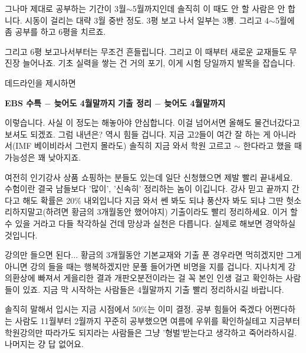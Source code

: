 그나마 제대로 공부하는 기간이 3월$\sim$5월까지인데 솔직히 이 때도 안 할 사람은 안 합니다.
시동이 걸리는 대략 3월 중반 정도. 3평 보고 나서 일부는 3뽕.
그리고 4$\sim$5월에 좀 공부를 하고 6평을 치르죠.
\vspace{5mm}

그리고 6평 보고나서부터는 무조건 흔들립니다. 그리고 이 때부터 새로운 교재들도 무진장 늘어나죠.
기초 실력을 쌓는 건 거의 포기, 이게 시험 당일까지 발목을 잡습니다.
\vspace{5mm}

데드라인을 제시하면
\vspace{5mm}

\textbf{EBS 수특 $-$ 늦어도 4월말까지}
\textbf{기출 정리 $-$ 늦어도 4월말까지}
\vspace{5mm}

이렇습니다. 사실 이 정도는 해놓아야 안심합니다. 이걸 넘어서면 올해도 물건너갔다고 보셔도 되겠죠.
그럼 내년은? 역시 힘들 겁니다. 지금 고2들이 여간 잘 하는 게 아니라서(IMF 베이비라서 그런지 몰라도)
솔직히 지금 와서 학원 고르고 $\sim$ 한다라고 했을 때 가능성은 꽤 낮아지죠.
\vspace{5mm}

여전히 인기강사 상품 쇼핑하는 분들도 있는데 일단 신청했으면 제발 빨리 끝내세요.
수험이란 결국 남들보다 '많이', '신속히' 정리하는 놈이 이깁니다. 강사 믿고 끝까지 간다고 해도 확률은 20$\%$ 내외입니다
지금 와서 쎈 봐도 되냐 풍산자 봐도 되냐 그딴 헛소리하지말고(하려면 황금의 3개월동안 했어야지)
기출이라도 빨리 정리하세요. 이거 할 수 있을 거라고 다들 착각하실 건데 망상과 실천은 다릅니다. 실제로 해보면 경악하실 것입니다.
\vspace{5mm}

강의만 들으면 된다... 황금의 3개월동안 기본교재와 기출 푼 경우라면 먹히겠지만 그게 아니면 강의 들을 때는 행복하겠지만
문풀 들어가면 비명을 지를 겁니다. 지나치게 강의환상에 빠져서 게을리한 결과 개판오분전이라는 걸 꼭 본인 인생 걸고 확인하는 사람들이 있죠.
지금 막 시작하는 사람들은 4월말까지 기출 빨리 정리하시길 바랍니다.
\vspace{5mm}

솔직히 말해서 입시는 지금 시점에서 50$\%$는 이미 결정.
공부 힘들어 죽겠다 어쩐다하는 사람도 11월부터 2월까지 꾸준히 공부했으면 여름에 우위를 확인하실테고
지금부터 학원강의만 따라가도 되지라는 사람들은 그냥 '형벌'받는다고 생각하고 죽어라하시길.
나머지는 걍 답 없어요.
\vspace{5mm}










